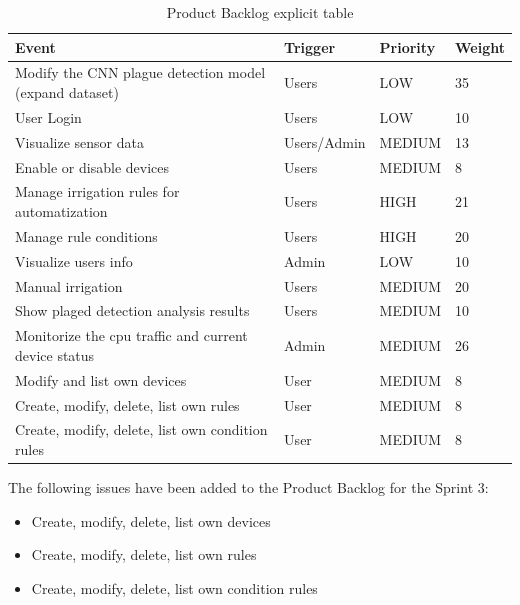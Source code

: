 \documentclass[11pt,a4paper]{article}
\begin{document}
\begin{table}[htbp]
\begin{tabular}{|l|l|l|l|} 
\hline
Event                                                & Trigger     & Priority & Weight \\ \hline \hline
Modify the CNN plague detection model (expand dataset) & Users       & LOW     & 35  \\ \hline
User Login                                             & Users       & LOW   & 10  \\ \hline              
Visualize sensor data                                & Users/Admin & MEDIUM   & 13     \\ \hline
Enable or disable devices                            & Users       & MEDIUM   & 8      \\ \hline
Manage irrigation rules for automatization           & Users       & HIGH   & 21      \\ \hline
Manage rule conditions                               & Users       & HIGH   & 20     \\ \hline
Visualize users info                                 & Admin       & LOW      & 10     \\ \hline
Manual irrigation                                    & Users       & MEDIUM   & 20     \\ \hline
Show plaged detection analysis results               & Users       & MEDIUM   & 10     \\ \hline
Monitorize the cpu traffic and current device status & Admin       & MEDIUM   & 26     \\ \hline
Modify and list own devices                          & User        & MEDIUM   & 8      \\ \hline
Create, modify, delete, list own rules               & User        & MEDIUM   & 8      \\ \hline
Create, modify, delete, list own condition rules     & User        & MEDIUM   & 8      \\ \hline
\end{tabular}
\caption{Product Backlog explicit table}
\end{table}
The following issues have been added to the Product Backlog for the Sprint 3: 
\begin{itemize}
    \item Create, modify, delete, list own devices
    \item Create, modify, delete, list own rules
    \item Create, modify, delete, list own condition rules
\end{itemize}
\end{document}

